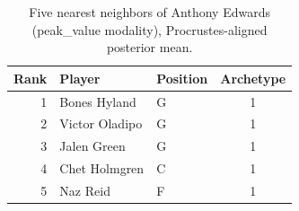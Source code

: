 \begin{table}[htbp]
  \centering\small
  \begin{tabular}{rllc}
    \toprule
    Rank & Player & Position & Archetype \\
    \midrule
    1 & Bones Hyland & G & 1 \\
    2 & Victor Oladipo & G & 1 \\
    3 & Jalen Green & G & 1 \\
    4 & Chet Holmgren & C & 1 \\
    5 & Naz Reid & F & 1 \\
    \bottomrule
  \end{tabular}
  \caption{Five nearest neighbors of Anthony Edwards (peak_value modality), Procrustes-aligned posterior mean.}
  \label{tab:Anthony_Edwards_neighbors_peak_value}
\end{table}

